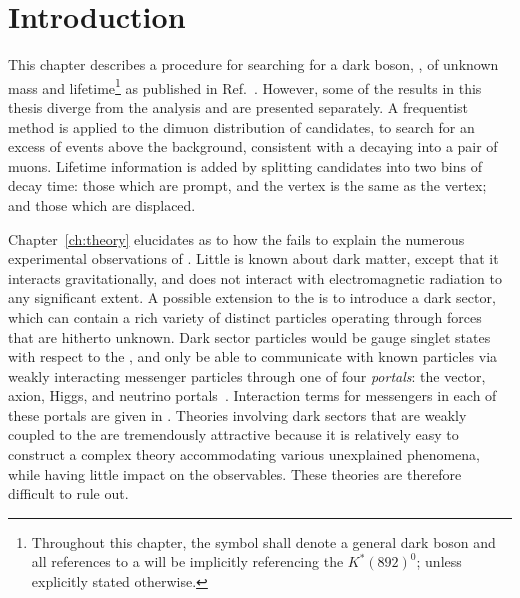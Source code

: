 \section{Introduction}
\label{sec:db:intro}


This chapter describes a procedure for searching for a dark boson, \db, of
unknown mass and lifetime\footnote{
  Throughout this chapter, the symbol \db shall denote a general dark boson and all references to
  a \Kstarz will be implicitly referencing the $K^*(892)^0$; unless explicitly stated otherwise.
} as published in Ref.~\cite{LHCb-PAPER-2015-036}. However, some of the results in this
thesis diverge from the \lhcb analysis and are presented separately.
A frequentist method is applied to the dimuon distribution of \btokstrmumu candidates,
to search for an excess of events above the \sm background, consistent with a \db decaying into a
pair of muons.
Lifetime information is added by
splitting candidates into two bins of decay time: those which are prompt, and the \db vertex is the
same as the \Kstarz vertex; and
those which are displaced.

Chapter~\ref{ch:theory} elucidates as to how the \sm fails to explain
the numerous experimental observations of \dm.
Little is known about dark matter, except that it interacts gravitationally, and does not interact
with electromagnetic radiation to any significant extent.
A possible extension to the \sm is to introduce a dark sector, which can contain a rich variety of
distinct particles operating through forces that are hitherto unknown.
Dark sector particles would be gauge singlet states with respect to the \sm, and
only be able to communicate with known particles via weakly interacting messenger particles
through one of four \emph{portals}: the vector, axion, Higgs, and neutrino
portals~\cite{Essig:2013lka}.
Interaction terms for messengers in each of these portals are given in
.
Theories involving dark sectors that are weakly coupled to the \sm are tremendously attractive
because it is relatively easy to construct a complex theory accommodating various
unexplained phenomena, while having little impact on the \sm observables.
These theories are therefore difficult to rule out.

